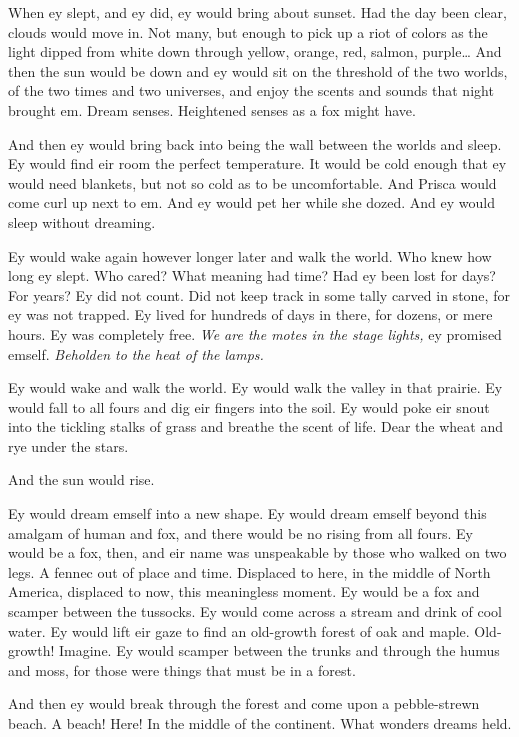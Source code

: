 When ey slept, and ey did, ey would bring about sunset. Had the day been clear, clouds would move in. Not many, but enough to pick up a riot of colors as the light dipped from white down through yellow, orange, red, salmon, purple\ldots{} And then the sun would be down and ey would sit on the threshold of the two worlds, of the two times and two universes, and enjoy the scents and sounds that night brought em. Dream senses. Heightened senses as a fox might have.

And then ey would bring back into being the wall between the worlds and sleep. Ey would find eir room the perfect temperature. It would be cold enough that ey would need blankets, but not so cold as to be uncomfortable. And Prisca would come curl up next to em. And ey would pet her while she dozed. And ey would sleep without dreaming.

Ey would wake again however longer later and walk the world. Who knew how long ey slept. Who cared? What meaning had time? Had ey been lost for days? For years? Ey did not count. Did not keep track in some tally carved in stone, for ey was not trapped. Ey lived for hundreds of days in there, for dozens, or mere hours. Ey was completely free. \emph{We are the motes in the stage lights,} ey promised emself. \emph{Beholden to the heat of the lamps.}

Ey would wake and walk the world. Ey would walk the valley in that prairie. Ey would fall to all fours and dig eir fingers into the soil. Ey would poke eir snout into the tickling stalks of grass and breathe the scent of life. Dear the wheat and rye under the stars.

And the sun would rise.

Ey would dream emself into a new shape. Ey would dream emself beyond this amalgam of human and fox, and there would be no rising from all fours. Ey would be a fox, then, and eir name was unspeakable by those who walked on two legs. A fennec out of place and time. Displaced to here, in the middle of North America, displaced to now, this meaningless moment. Ey would be a fox and scamper between the tussocks. Ey would come across a stream and drink of cool water. Ey would lift eir gaze to find an old-growth forest of oak and maple. Old-growth! Imagine. Ey would scamper between the trunks and through the humus and moss, for those were things that must be in a forest.

And then ey would break through the forest and come upon a pebble-strewn beach. A beach! Here! In the middle of the continent. What wonders dreams held.

